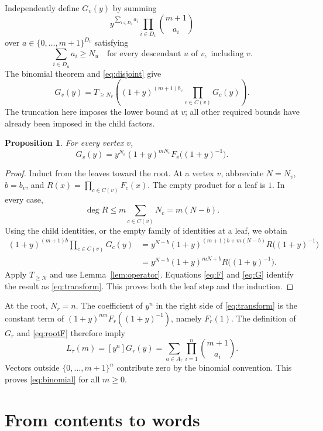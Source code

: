 \documentclass[11pt]{article}
\newtheorem{proposition}[theorem]{Proposition}
\begin{document}
Independently define $G_v(y)$ by summing
\[
 y^{\sum_{i\in D_v}a_i}\prod_{i\in D_v}\binom{m+1}{a_i}
\]
over $a\in\{0,\ldots,m+1\}^{D_v}$ satisfying
\[
 \sum_{i\in D_u}a_i\geq N_u
 \quad\text{for every descendant }u\text{ of }v,\text{ including }v.
\]
The binomial theorem and \eqref{eq:disjoint} give
\begin{equation}\label{eq:G}
 G_v(y)=T_{\geq N_v}\!\left((1+y)^{(m+1)b_v}
                                 \prod_{c\in C(v)}G_c(y)\right).
\end{equation}
The truncation here imposes the lower bound at $v$; all other required
bounds have already been imposed in the child factors.

\begin{proposition}\label{prop:transform}
For every vertex $v$,
\begin{equation}\label{eq:transform}
 G_v(y)=y^{N_v}(1+y)^{mN_v}F_v\bigl((1+y)^{-1}\bigr).
\end{equation}
\end{proposition}

\begin{proof}
Induct from the leaves toward the root. At a vertex $v$, abbreviate
$N=N_v$, $b=b_v$, and $R(x)=\prod_{c\in C(v)}F_c(x)$. The empty product
for a leaf is $1$. In every case,
\[
 \deg R\leq m\sum_{c\in C(v)}N_c=m(N-b).
\]
Using the child identities, or the empty family of identities at a leaf,
we obtain
\begin{align*}
 (1+y)^{(m+1)b}\prod_{c\in C(v)}G_c(y)
   &=y^{N-b}(1+y)^{(m+1)b+m(N-b)}R\bigl((1+y)^{-1}\bigr)\\
   &=y^{N-b}(1+y)^{mN+b}R\bigl((1+y)^{-1}\bigr).
\end{align*}
Apply $T_{\geq N}$ and use Lemma~\ref{lem:operator}. Equations
\eqref{eq:F} and \eqref{eq:G} identify the result as
\eqref{eq:transform}. This proves both the leaf step and the induction.
\end{proof}

At the root, $N_r=n$. The coefficient of $y^n$ in the right side of
\eqref{eq:transform} is the constant term of
$(1+y)^{mn}F_r((1+y)^{-1})$, namely $F_r(1)$. The definition of $G_r$
and \eqref{eq:rootF} therefore imply
\[
 L_\tau(m)=[y^n]G_r(y)
          =\sum_{a\in A_\tau}\prod_{i=1}^n\binom{m+1}{a_i}.
\]
Vectors outside $\{0,\ldots,m+1\}^n$ contribute zero by the binomial
convention. This proves \eqref{eq:binomial} for all $m\geq0$.

\section{From contents to words}
\end{document}
